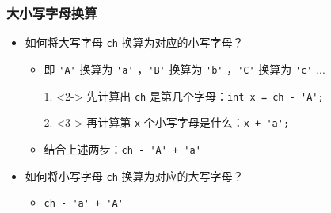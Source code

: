 \begin{frame}[fragile]
    \frametitle{大小写字母换算}

    \begin{itemize}
        \item 如何将大写字母 \lstinline|ch| 换算为对应的小写字母？
        
        \begin{itemize}
            \item 即 \lstinline|'A'| 换算为 \lstinline|'a'| ，\lstinline|'B'| 换算为 \lstinline|'b'| ，\lstinline|'C'| 换算为 \lstinline|'c'| ...
        \end{itemize}
        
        \begin{enumerate}
            \item[1.] <2-> 先计算出 \lstinline|ch| 是第几个字母：\lstinline|int x = ch - 'A';|
            \item[2.] <3-> 再计算第 \lstinline|x| 个小写字母是什么：\lstinline|x + 'a';|
        \end{enumerate}

        \begin{itemize}
            \item<4-> 结合上述两步：\lstinline|ch - 'A' + 'a'|
        \end{itemize}

        \item<5-> 如何将小写字母 \lstinline|ch| 换算为对应的大写字母？
        
        \begin{itemize}
            \item<6-> \lstinline|ch - 'a' + 'A'|
        \end{itemize}

    \end{itemize}

\end{frame}

